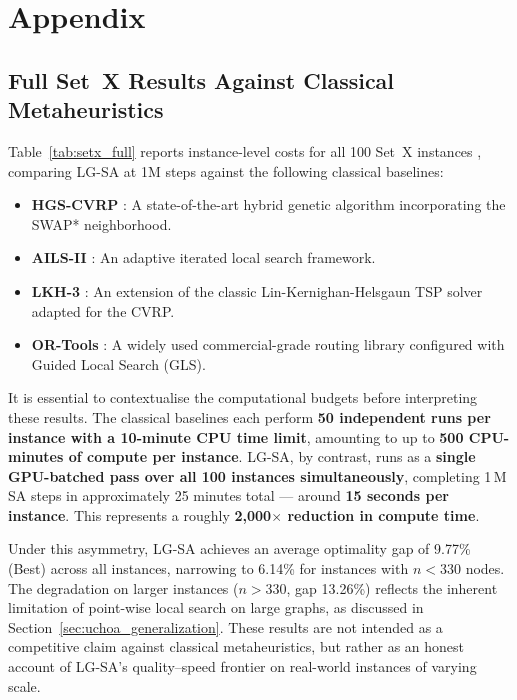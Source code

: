 \documentclass[letterpaper]{article} %
\begin{document}
\newpage



\newpage
\section{Appendix}

\subsection{Full Set~X Results Against Classical Metaheuristics}
\label{app:setx_full}

Table~\ref{tab:setx_full} reports instance-level costs for all 100 Set~X instances \citep{uchoa_new_2017}, comparing LG-SA at 1M steps against the following classical baselines:
\begin{itemize}
    \item \textbf{HGS-CVRP} \citep{vidal_hybrid_2022}: A state-of-the-art hybrid genetic algorithm incorporating the SWAP* neighborhood.
    \item \textbf{AILS-II} \citep{maximo_adaptive_2021}: An adaptive iterated local search framework.
    \item \textbf{LKH-3} \citep{helsgaun_extension_2017}: An extension of the classic Lin-Kernighan-Helsgaun TSP solver adapted for the CVRP.
    \item \textbf{OR-Tools} \citep{ortools_routing}: A widely used commercial-grade routing library configured with Guided Local Search (GLS).
\end{itemize}

It is essential to contextualise the computational budgets before interpreting these results.
The classical baselines each perform \textbf{50 independent runs per instance with a 10-minute CPU time limit}, amounting to up to \textbf{500 CPU-minutes of compute per instance}.
LG-SA, by contrast, runs as a \textbf{single GPU-batched pass over all 100 instances simultaneously}, completing 1\,M SA steps in approximately 25 minutes total — around \textbf{15 seconds per instance}.
This represents a roughly \textbf{2{,}000$\times$ reduction in compute time}.

Under this asymmetry, LG-SA achieves an average optimality gap of 9.77\% (Best) across all instances, narrowing to 6.14\% for instances with $n < 330$ nodes.
The degradation on larger instances ($n > 330$, gap 13.26\%) reflects the inherent limitation of point-wise local search on large graphs, as discussed in Section~\ref{sec:uchoa_generalization}.
These results are not intended as a competitive claim against classical metaheuristics, but rather as an honest account of LG-SA's quality--speed frontier on real-world instances of varying scale.
\end{document}
